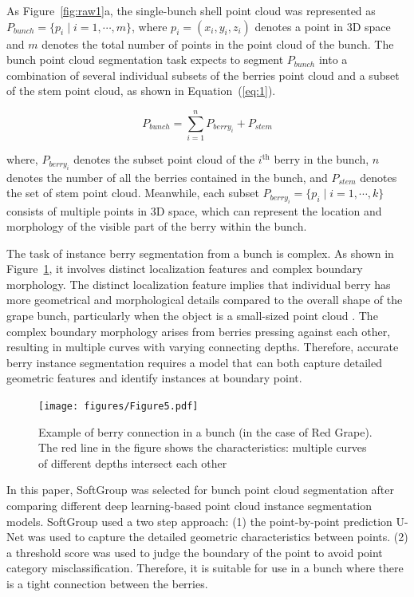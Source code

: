 \documentclass[12pt]{article}
\begin{document}
As Figure~\ref{fig:raw1}a, the single-bunch shell point cloud was represented as $P_{bunch}=\{p_i \mid i=1, \cdots, m\}$, where $p_i=(x_i,y_i,z_i)$ denotes a point in 3D space and $m$ denotes the total number of points in the point cloud of the bunch. The bunch point cloud segmentation task expects to segment $P_{bunch}$ into a combination of several individual subsets of the berries point cloud and a subset of the stem point cloud, as shown in Equation~(\ref{eq:1}).

\begin{equation}
P_{bunch} = \sum_{i=1}^{n} P_{berry_{i}} + P_{stem}
\label{eq:1}
\end{equation}

{\raggedright where, $P_{berry_{i}}$ denotes the subset point cloud of the $i^{\text{th}}$ berry in the bunch, $n$ denotes the number of all the berries contained in the bunch, and $P_{stem}$ denotes the set of stem point cloud. 
Meanwhile, each subset $P_{berry_{i}}=\{p_i \mid i=1, \cdots, k\}$ consists of multiple points in 3D space, which can represent the location and morphology of the visible part of the berry within the bunch.}

The task of instance berry segmentation from a bunch is complex. 
As shown in Figure~\ref{fig:raw2}, it involves distinct localization features and complex boundary morphology. 
The distinct localization feature implies that individual berry has more geometrical and morphological details compared to the overall shape of the grape bunch, particularly when the object is a small-sized point cloud \citep{luo_infield_2022}. 
The complex boundary morphology arises from berries pressing against each other, resulting in multiple curves with varying connecting depths. 
Therefore, accurate berry instance segmentation requires a model that can both capture detailed geometric features and identify instances at boundary point. 

\begin{figure}[hbt!]
    \centering
    \texttt{[image: figures/Figure5.pdf]}
    \caption{Example of berry connection in a bunch (in the case of Red Grape). The red line in the figure shows the characteristics: multiple curves of different depths intersect each other}
    \label{fig:raw2}
\end{figure}

In this paper, SoftGroup \citep{vu_softgroup_2022} was selected for bunch point cloud segmentation after comparing different deep learning-based point cloud instance segmentation models. 
SoftGroup used a two step approach: 
(1) the point-by-point prediction U-Net was used to capture the detailed geometric characteristics between points. 
(2) a threshold score was used to judge the boundary of the point to avoid point category misclassification. 
Therefore, it is suitable for use in a bunch where there is a tight connection between the berries.
\end{document}
